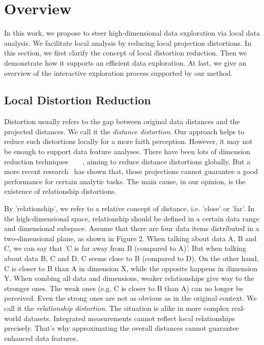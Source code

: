 \section{Overview}
\label{section:overview}
In this work, we propose to steer high-dimensional data exploration via local data analysis. We facilitate local analysis by reducing local projection distortions. In this section, we first clarify the concept of local distortion reduction. Then we demonstrate how it supports an efficient data exploration. At last, we give an overview of the interactive exploration process supported by our method.

\subsection{Local Distortion Reduction}
Distortion usually refers to the gap between original data distances and the projected distances. We call it the \emph{distance distortion}. Our approach helps to reduce such distortions locally for a more faith perception. However, it may not be enough to support data feature analyses. There have been lots of dimension reduction techniques~\cite{jolliffe2002principal}~\cite{borg2005modern}~\cite{tenenbaum2000global}~\cite{roweis2000nonlinear}, aiming to reduce distance distortions globally. But a more recent research~\cite{DBLP:journals/tvcg/EtemadpourMPMOL15} has shown that, those projections cannot guarantee a good performance for certain analytic tasks. The main cause, in our opinion, is the existence of relationship distortions.

By 'relationship', we refer to a relative concept of distance, i.e. 'close' or 'far'. In the high-dimensional space, relationship should be defined in a certain data range and dimensional subspace. Assume that there are four data items distributed in a two-dimensional plane, as shown in Figure 2. When talking about data A, B and C, we can say that 'C is far away from B (compared to A)'. But when talking about data B, C and D, C seems close to B (compared to D). On the other hand, C is closer to B than A in dimension X, while the opposite happens in dimension Y. When combing all data and dimensions, weaker relationships give way to the stronger ones. The weak ones (e.g. C is closer to B than A) can no longer be perceived. Even the strong ones are not as obvious as in the original context. We call it the \emph{relationship distortion}. The situation is alike in more complex real-world datasets. Integrated measurements cannot reflect local relationships precisely. That's why approximating the overall distances cannot guarantee enhanced data features.

